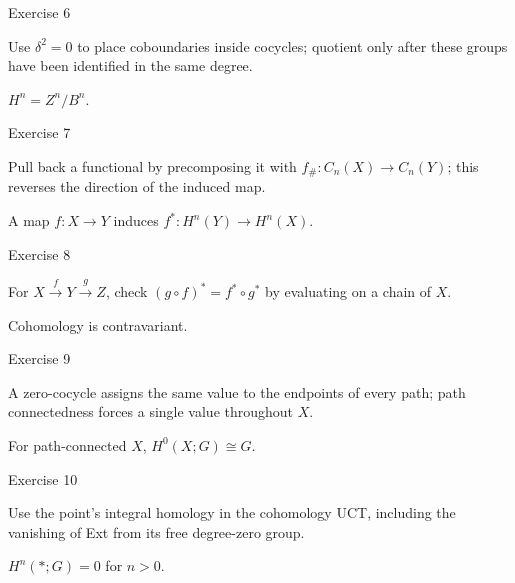 \begin{exercise}\label{exr:viii28-06}
Exercise 6
\end{exercise}
\begin{hint}
Use \(\delta^2=0\) to place coboundaries inside cocycles; quotient only after these groups have been identified in the same degree.
\end{hint}
\begin{solution}
\(H^n=Z^n/B^n\).
\end{solution}

\begin{exercise}\label{exr:viii28-07}
Exercise 7
\end{exercise}
\begin{hint}
Pull back a functional by precomposing it with \(f_\#:C_n(X)\to C_n(Y)\); this reverses the direction of the induced map.
\end{hint}
\begin{solution}
A map \(f:X\to Y\) induces \(f^*:H^n(Y)\to H^n(X)\).
\end{solution}

\begin{exercise}\label{exr:viii28-08}
Exercise 8
\end{exercise}
\begin{hint}
For \(X\xrightarrow f Y\xrightarrow g Z\), check \((g\circ f)^*=f^*\circ g^*\) by evaluating on a chain of \(X\).
\end{hint}
\begin{solution}
Cohomology is contravariant.
\end{solution}

\begin{exercise}\label{exr:viii28-09}
Exercise 9
\end{exercise}
\begin{hint}
A zero-cocycle assigns the same value to the endpoints of every path; path connectedness forces a single value throughout \(X\).
\end{hint}
\begin{solution}
For path-connected \(X\), \(H^0(X;G)\cong G\).
\end{solution}

\begin{exercise}\label{exr:viii28-10}
Exercise 10
\end{exercise}
\begin{hint}
Use the point's integral homology in the cohomology UCT, including the vanishing of Ext from its free degree-zero group.
\end{hint}
\begin{solution}
\(H^n(*;G)=0\) for \(n>0\).
\end{solution}

